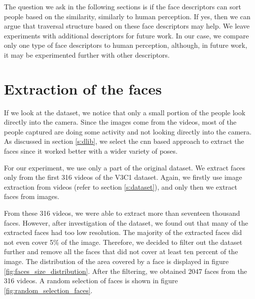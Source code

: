 
The question we ask in the following sections is if the face descriptors can sort people based on the similarity, similarly to human perception. If yes, then we can argue that traversal structure based on these face descriptors may help. We leave experiments with additional descriptors for future work. In our case, we compare only one type of face descriptors to human perception, although, in future work, it may be experimented further with other descriptors.


\section{Extraction of the faces}

If we look at the dataset, we notice that only a small portion of the people look directly into the camera. Since the images come from the videos, most of the people captured are doing some activity and not looking directly into the camera. As discussed in section \ref{s:dlib}, we select the \acrshort{cnn} based approach to extract the faces since it worked better with a wider variety of poses.

For our experiment, we use only a part of the original dataset. We extract faces only from the first 316 videos of the V3C1 dataset. Again, we firstly use image extraction from videos (refer to section \ref{s:dataset}), and only then we extract faces from images. 

From these 316 videos, we were able to extract more than seventeen thousand faces. However, after investigation of the dataset, we found out that many of the extracted faces had too low resolution. The majority of the extracted faces did not even cover 5\% of the image. Therefore, we decided to filter out the dataset further and remove all the faces that did not cover at least ten percent of the image. The distribution of the area covered by a face is displayed in figure \ref{fig:faces_size_distribution}. After the filtering,  we obtained 2047 faces from the 316 videos. A random selection of faces is shown in figure \ref{fig:random_selection_faces}. 

